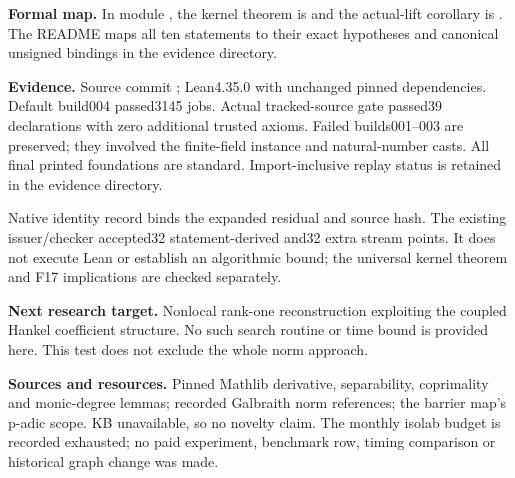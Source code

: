\documentclass[11pt]{article}
\begin{document}
\textbf{Formal map.} In module , the kernel theorem is
 and the actual-lift corollary is .
The README maps all ten statements to their exact hypotheses and canonical
unsigned bindings in the evidence directory.

\textbf{Evidence.} Source commit ; Lean4.35.0 with unchanged
pinned dependencies. Default build004 passed3145 jobs. Actual tracked-source
gate passed39 declarations with zero additional trusted axioms. Failed
builds001--003 are preserved; they involved the finite-field instance and
natural-number casts. All final printed foundations are standard.
Import-inclusive replay status is retained in the evidence directory.

Native identity record  binds the expanded residual
and source hash. The existing issuer/checker accepted32 statement-derived
and32 extra stream points. It does not execute Lean or establish an algorithmic
bound; the universal kernel theorem and F17 implications are checked separately.

\textbf{Next research target.} Nonlocal rank-one reconstruction exploiting the
coupled Hankel coefficient structure. No such search routine or time bound is
provided here. This test does not exclude the whole norm approach.

\textbf{Sources and resources.} Pinned Mathlib derivative, separability,
coprimality and monic-degree lemmas; recorded Galbraith norm references;
the barrier map's p-adic scope. KB unavailable, so no novelty claim.
The monthly isolab budget is recorded exhausted; no paid experiment,
benchmark row, timing comparison or historical graph change was made.
\end{document}
